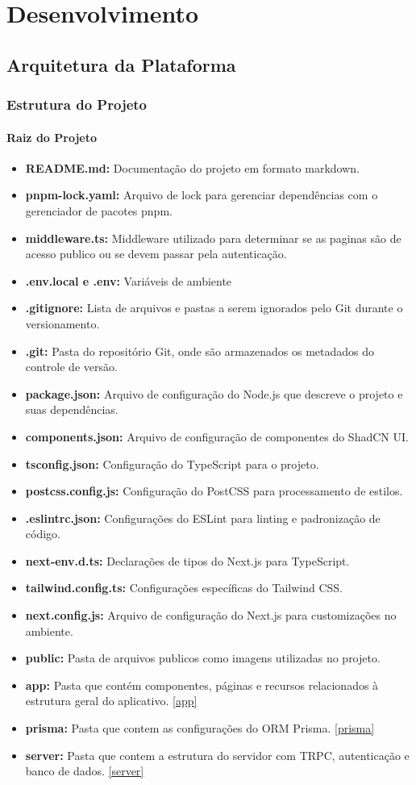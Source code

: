 \part{Desenvolvimento}
\chapter{Arquitetura da Plataforma}
\section{Estrutura do Projeto}

\subsection{Raiz do Projeto}
\begin{itemize}
\item \textbf{README.md:} Documentação do projeto em formato markdown.
\item \textbf{pnpm-lock.yaml:} Arquivo de lock para gerenciar dependências com o gerenciador de pacotes pnpm.
\item \textbf{middleware.ts:} Middleware utilizado para determinar se as paginas são de acesso publico ou se devem passar pela autenticação.
\item \textbf{.env.local e .env:} Variáveis de ambiente
\item \textbf{.gitignore:} Lista de arquivos e pastas a serem ignorados pelo Git durante o versionamento.
\item \textbf{.git:} Pasta do repositório Git, onde são armazenados os metadados do controle de versão.
\item \textbf{package.json:} Arquivo de configuração do Node.js que descreve o projeto e suas dependências.
\item \textbf{components.json:} Arquivo de configuração de componentes do ShadCN UI.
\item \textbf{tsconfig.json:} Configuração do TypeScript para o projeto.
\item \textbf{postcss.config.js:} Configuração do PostCSS para processamento de estilos.
\item \textbf{.eslintrc.json:} Configurações do ESLint para linting e padronização de código.
\item \textbf{next-env.d.ts:} Declarações de tipos do Next.js para TypeScript.
\item \textbf{tailwind.config.ts:} Configurações específicas do Tailwind CSS.
\item \textbf{next.config.js:} Arquivo de configuração do Next.js para customizações no ambiente.
\item \textbf{public:} Pasta de arquivos publicos como imagens utilizadas no projeto.
\item \textbf{app:} Pasta que contém componentes, páginas e recursos relacionados à estrutura geral do aplicativo. \ref{app}
\item \textbf{prisma:} Pasta que contem as configurações do ORM Prisma. \ref{prisma}
\item \textbf{server:} Pasta que contem a estrutura do servidor com TRPC, autenticação e banco de dados. \ref{server}
\end{itemize}

